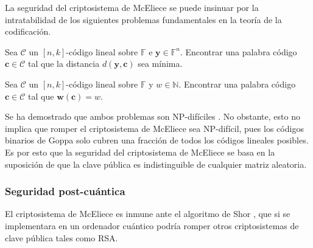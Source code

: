 La seguridad del criptosistema de McEliece se puede insinuar por la intratabilidad de los siguientes problemas fundamentales en la teoría de la codificación.

\begin{problemth}
    Sea $\mathcal{C}$ un $[n, k]$-código lineal sobre $\mathbb{F}$ e $\textbf{y} \in \mathbb{F}^n$. Encontrar una palabra código $\textbf{c} \in \mathcal{C}$ tal que la distancia $d(\textbf{y}, \textbf{c})$ sea mínima.
\end{problemth}

\begin{problemth}
    Sea $\mathcal{C}$ un $[n, k]$-código lineal sobre $\mathbb{F}$ y $w \in \mathbb{N}$. Encontrar una palabra código $\textbf{c} \in \mathcal{C}$ tal que $\textbf{w}(\textbf{c}) = w$.
\end{problemth}

Se ha demostrado que ambos problemas son NP-difíciles \cite{Intractability_coding_problems}. No obstante, esto no implica que romper el criptosistema de McEliece sea NP-difícil, pues los códigos binarios de Goppa solo cubren una fracción de todos los códigos lineales posibles. Es por esto que la seguridad del criptosistema de McEliece se basa en la suposición de que la clave pública es indistinguible de cualquier matriz aleatoria.

\subsubsection{Seguridad post-cuántica}

El criptosistema de McEliece es inmune ante el algoritmo de Shor \cite{Shor_1997}, que si se implementara en un ordenador cuántico podría romper otros criptosistemas de clave pública tales como RSA. 